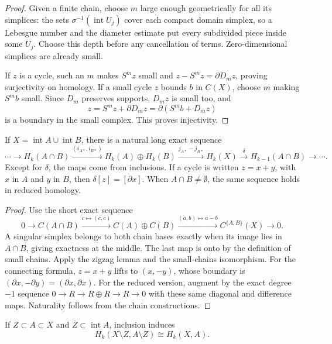 \begin{proof}
Given a finite chain, choose $m$ large enough geometrically for all its simplices: the sets $\sigma^{-1}(\operatorname{int}U_j)$ cover each compact domain simplex, so a Lebesgue number and the diameter estimate put every subdivided piece inside some $U_j$. Choose this depth before any cancellation of terms. Zero-dimensional simplices are already small.

If $z$ is a cycle, such an $m$ makes $S^mz$ small and $z-S^mz=\partial D_mz$, proving surjectivity on homology. If a small cycle $z$ bounds $b$ in $C(X)$, choose $m$ making $S^mb$ small. Since $D_m$ preserves supports, $D_mz$ is small too, and
\[
z=S^mz+\partial D_mz=\partial(S^mb+D_mz)
\]
is a boundary in the small complex. This proves injectivity.
\end{proof}

\begin{theorem}\label{thm:mv}
If $X=\operatorname{int}A\cup\operatorname{int}B$, there is a natural long exact sequence
\[
\cdots\to H_k(A\cap B)\xrightarrow{(i_{A*},i_{B*})}H_k(A)\oplus H_k(B)
\xrightarrow{j_{A*}-j_{B*}}H_k(X)\xrightarrow{\delta}H_{k-1}(A\cap B)\to\cdots.
\]
Except for $\delta$, the maps come from inclusions. If a cycle is written $z=x+y$, with $x$ in $A$ and $y$ in $B$, then $\delta[z]=[\partial x]$. When $A\cap B\ne\emptyset$, the same sequence holds in reduced homology.
\end{theorem}

\begin{proof}
Use the short exact sequence
\[
0\to C(A\cap B)\xrightarrow{c\mapsto(c,c)}C(A)\oplus C(B)
\xrightarrow{(a,b)\mapsto a-b}C^{\{A,B\}}(X)\to0.
\]
A singular simplex belongs to both chain bases exactly when its image lies in $A\cap B$, giving exactness at the middle. The last map is onto by the definition of small chains. Apply the zigzag lemma and the small-chains isomorphism. For the connecting formula, $z=x+y$ lifts to $(x,-y)$, whose boundary is $(\partial x,-\partial y)=(\partial x,\partial x)$. For the reduced version, augment by the exact degree $-1$ sequence $0\to R\to R\oplus R\to R\to0$ with these same diagonal and difference maps. Naturality follows from the chain constructions.
\end{proof}

\begin{corollary}[excision]\label{cor:excision}
If $Z\subset A\subset X$ and $\overline Z\subset\operatorname{int}A$, inclusion induces
\[
H_k(X\setminus Z,A\setminus Z)\cong H_k(X,A).
\]
\end{corollary}

